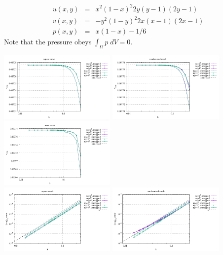 \begin{eqnarray}
u(x,y) &=& x^2(1-x)^2 2y (y-1)(2y-1) \nonumber\\
v(x,y) &=& -y^2 (1 - y)^2 2x (x-1)(2x-1) \nonumber\\
p(x,y) &=& x(1 -x)- 1/6 \nonumber 
\end{eqnarray}
Note that the pressure obeys $\int_{\Omega} p \; dV = 0$.


\begin{center}
\includegraphics[width=5.7cm]{python_codes/fieldstone_76/results/bench3/reg/vrms}
\includegraphics[width=5.7cm]{python_codes/fieldstone_76/results/bench3/rand/vrms}
\includegraphics[width=5.7cm]{python_codes/fieldstone_76/results/bench3/wave/vrms}\\
\includegraphics[width=5.7cm]{python_codes/fieldstone_76/results/bench3/reg/errors_V}
\includegraphics[width=5.7cm]{python_codes/fieldstone_76/results/bench3/rand/errors_V}

\end{center}
